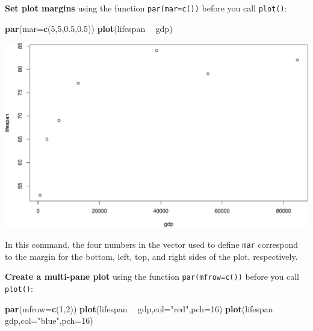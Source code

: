 \documentclass[]{book}
\newenvironment{Shaded}{\begin{snugshade}}{\end{snugshade}}
\newcommand{\DataTypeTok}[1]{\textcolor[rgb]{0.13,0.29,0.53}{#1}}
\newcommand{\DecValTok}[1]{\textcolor[rgb]{0.00,0.00,0.81}{#1}}
\newcommand{\FloatTok}[1]{\textcolor[rgb]{0.00,0.00,0.81}{#1}}
\newcommand{\KeywordTok}[1]{\textcolor[rgb]{0.13,0.29,0.53}{\textbf{#1}}}
\newcommand{\NormalTok}[1]{#1}
\newcommand{\OperatorTok}[1]{\textcolor[rgb]{0.81,0.36,0.00}{\textbf{#1}}}
\newcommand{\StringTok}[1]{\textcolor[rgb]{0.31,0.60,0.02}{#1}}
\begin{document}
\textbf{Set plot margins} using the function \texttt{par(mar=c())} before you call \texttt{plot()}:

\begin{Shaded}
\begin{Highlighting}[]
\KeywordTok{par}\NormalTok{(}\DataTypeTok{mar=}\KeywordTok{c}\NormalTok{(}\DecValTok{5}\NormalTok{,}\DecValTok{5}\NormalTok{,}\FloatTok{0.5}\NormalTok{,}\FloatTok{0.5}\NormalTok{))}
\KeywordTok{plot}\NormalTok{(lifespan }\OperatorTok{~}\StringTok{ }\NormalTok{gdp)}
\end{Highlighting}
\end{Shaded}

\includegraphics{figures/unnamed-chunk-235-1.pdf}

In this command, the four numbers in the vector used to define \texttt{mar} correspond to the margin for the bottom, left, top, and right sides of the plot, respectively.

\textbf{Create a multi-pane plot} using the function \texttt{par(mfrow=c())} before you call \texttt{plot()}:

\begin{Shaded}
\begin{Highlighting}[]
\KeywordTok{par}\NormalTok{(}\DataTypeTok{mfrow=}\KeywordTok{c}\NormalTok{(}\DecValTok{1}\NormalTok{,}\DecValTok{2}\NormalTok{))}
\KeywordTok{plot}\NormalTok{(lifespan }\OperatorTok{~}\StringTok{ }\NormalTok{gdp,}\DataTypeTok{col=}\StringTok{"red"}\NormalTok{,}\DataTypeTok{pch=}\DecValTok{16}\NormalTok{)}
\KeywordTok{plot}\NormalTok{(lifespan }\OperatorTok{~}\StringTok{ }\NormalTok{gdp,}\DataTypeTok{col=}\StringTok{"blue"}\NormalTok{,}\DataTypeTok{pch=}\DecValTok{16}\NormalTok{)}
\end{Highlighting}
\end{Shaded}
\end{document}
